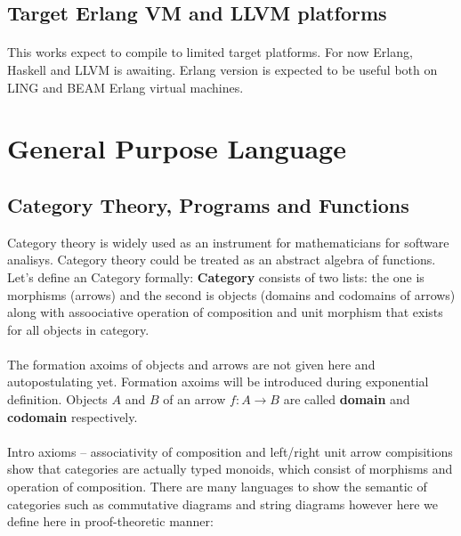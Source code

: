 \documentclass[11pt,oneside]{article}
\begin{document}
\subsection{Target Erlang VM and LLVM platforms}

   \paragraph{}
   This works expect to compile to limited target platforms. For now Erlang, Haskell and LLVM is awaiting.
   Erlang version is expected to be useful both on LING and BEAM Erlang virtual machines.

\newpage
\section{General Purpose Language}
\vspace{0.3cm}

   \subsection{Category Theory, Programs and Functions}
   Category theory is widely used as an instrument for mathematicians for software analisys.
   Category theory could be treated as an abstract algebra of functions. Let's define an Category
   formally: {\bf Category} consists of two lists: the one is morphisms (arrows) and the second is
   objects (domains and codomains of arrows) along with assoociative operation of composition and
   unit morphism that exists for all objects in category.

   \paragraph{}
   The formation axoims of objects and arrows are not given here and autopostulating yet. Formation axoims
   will be introduced during exponential definition. Objects $A$ and $B$ of an arrow $f: A \rightarrow B$
   are called {\bf domain} and {\bf codomain} respectively.

   \paragraph{}
   Intro axioms -- associativity of composition and left/right unit arrow compisitions show that
   categories are actually typed monoids, which consist of morphisms and operation of composition.
   There are many languages to show the semantic of categories such as commutative diagrams and string diagrams
   however here we define here in proof-theoretic manner:
\end{document}
